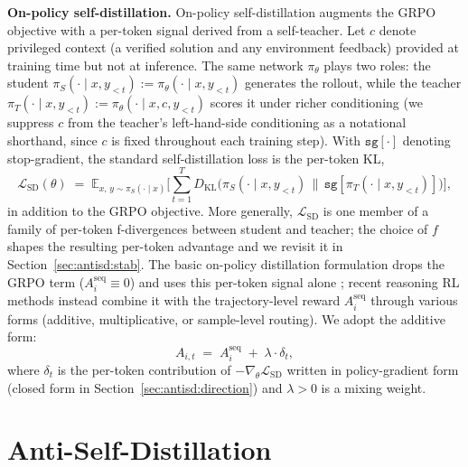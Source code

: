 \documentclass{article}
\begin{document}
\textbf{On-policy self-distillation.} On-policy self-distillation augments the GRPO objective with a per-token signal derived from a self-teacher. Let $c$ denote privileged context (a verified solution and any environment feedback) provided at training time but not at inference. The same network $\pi_\theta$ plays two roles: the student $\pi_S(\cdot \mid x, y_{<t}) := \pi_\theta(\cdot \mid x, y_{<t})$ generates the rollout, while the teacher $\pi_T(\cdot \mid x, y_{<t}) := \pi_\theta(\cdot \mid x, c, y_{<t})$ scores it under richer conditioning (we suppress $c$ from the teacher's left-hand-side conditioning as a notational shorthand, since $c$ is fixed throughout each training step). With $\texttt{sg}[\cdot]$ denoting stop-gradient, the standard self-distillation loss is the per-token KL,
\begin{equation}
  \label{eq:sd}
  \mathcal{L}_{\mathrm{SD}}(\theta)
  \;=\;
  \mathbb{E}_{x,\, y \sim \pi_S(\cdot \mid x)}
  \Big[ \sum_{t=1}^{T} D_{\mathrm{KL}}\!\big( \pi_S(\cdot \mid x, y_{<t}) \,\big\|\, \texttt{sg}[\pi_T(\cdot \mid x, y_{<t})] \big) \Big],
\end{equation}
in addition to the GRPO objective. More generally, $\mathcal{L}_{\mathrm{SD}}$ is one member of a family of per-token f-divergences between student and teacher; the choice of $f$ shapes the resulting per-token advantage and we revisit it in Section~\ref{sec:antisd:stab}. The basic on-policy distillation formulation drops the GRPO term ($A_i^{\mathrm{seq}} \equiv 0$) and uses this per-token signal alone \citep{gkd,fu2026revisitingonpolicydistillationempirical,opsd}; recent reasoning RL methods \citep{sdpo,li2026unifying,xiao2026mimo} instead combine it with the trajectory-level reward $A_i^{\mathrm{seq}}$ through various forms (additive, multiplicative, or sample-level routing). We adopt the additive form:
\begin{equation}
  \label{eq:adv-combined}
  A_{i,t} \;=\; A_i^{\mathrm{seq}} \;+\; \lambda \cdot \delta_t,
\end{equation}
where $\delta_t$ is the per-token contribution of $-\nabla_\theta \mathcal{L}_{\mathrm{SD}}$ written in policy-gradient form (closed form in Section~\ref{sec:antisd:direction}) and $\lambda > 0$ is a mixing weight.

\section{Anti-Self-Distillation}
\label{sec:antisd}
\vspace{-.5em}
\end{document}
